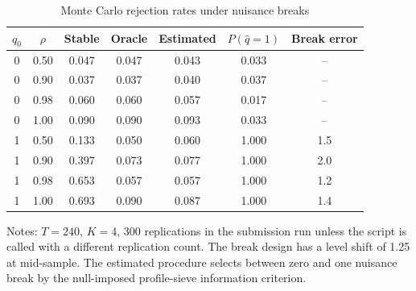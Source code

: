 \begin{table}[t]
\centering
\caption{Monte Carlo rejection rates under nuisance breaks}
\label{tab:break-mc}
\begin{tabular}{ccccccc}
\hline
$q_0$ & $\rho$ & Stable & Oracle & Estimated & $P(\widehat q=1)$ & Break error \\
\hline
0 & 0.50 & 0.047 & 0.047 & 0.043 & 0.033 & -- \\
0 & 0.90 & 0.037 & 0.037 & 0.040 & 0.037 & -- \\
0 & 0.98 & 0.060 & 0.060 & 0.057 & 0.017 & -- \\
0 & 1.00 & 0.090 & 0.090 & 0.093 & 0.033 & -- \\
1 & 0.50 & 0.133 & 0.050 & 0.060 & 1.000 & 1.5 \\
1 & 0.90 & 0.397 & 0.073 & 0.077 & 1.000 & 2.0 \\
1 & 0.98 & 0.653 & 0.057 & 0.057 & 1.000 & 1.2 \\
1 & 1.00 & 0.693 & 0.090 & 0.087 & 1.000 & 1.4 \\
\hline
\end{tabular}
\begin{minipage}{0.94\linewidth}
\footnotesize Notes: $T=240$, $K=4$, 300 replications in the submission run unless the script is called with a different replication count. The break design has a level shift of 1.25 at mid-sample. The estimated procedure selects between zero and one nuisance break by the null-imposed profile-sieve information criterion.
\end{minipage}
\end{table}
